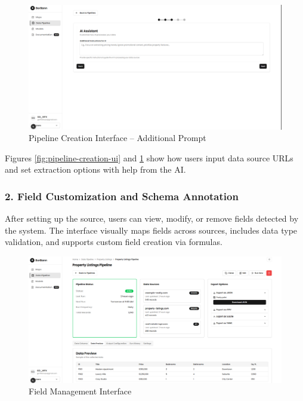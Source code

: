 \begin{figure}[htbp]
	\centering
	\includegraphics[width=1\textwidth]{assets/ai/pipeline-3.png}
	\caption{Pipeline Creation Interface – Additional Prompt}
	\label{fig:pipeline-creation-ui-2}
\end{figure}

Figures \ref{fig:pipeline-creation-ui} and \ref{fig:pipeline-creation-ui-2} show how users input data source URLs and set extraction options with help from the AI.

\subsubsection*{2. Field Customization and Schema Annotation}

After setting up the source, users can view, modify, or remove fields detected by the system. The interface visually maps fields across sources, includes data type validation, and supports custom field creation via formulas.

\begin{figure}[htbp]
	\centering
	\includegraphics[width=1\textwidth]{assets/ai/pipeline-4.png}
	\caption{Field Management Interface}
	\label{fig:pipeline-creation-ui-3}
\end{figure}

